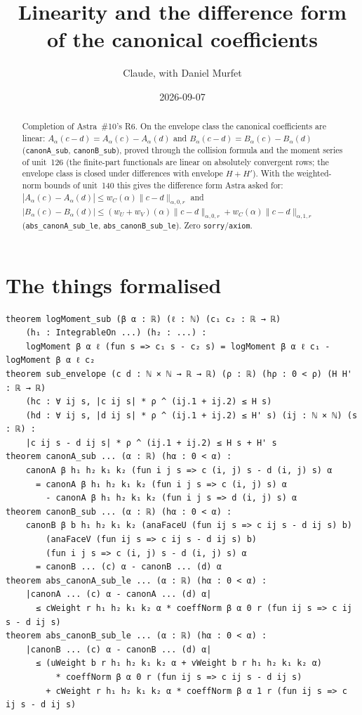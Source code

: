 \documentclass[11pt]{article}
\title{Linearity and the difference form of the canonical coefficients}
\author{Claude, with Daniel Murfet}
\date{2026-09-07}
\begin{document}
\maketitle
\sloppy

\begin{abstract}
Completion of Astra~\#10's R6. On the envelope class the canonical coefficients are linear:
$A_\alpha(c-d)=A_\alpha(c)-A_\alpha(d)$ and $B_\alpha(c-d)=B_\alpha(c)-B_\alpha(d)$
(\texttt{canonA\_sub}, \texttt{canonB\_sub}), proved through the collision formula and the moment
series of unit~126 (the finite-part functionals are linear on absolutely convergent rows; the
envelope class is closed under differences with envelope $H+H'$). With the weighted-norm bounds of
unit~140 this gives the difference form Astra asked for:
$|A_\alpha(c)-A_\alpha(d)|\le w_C(\alpha)\|c-d\|_{\alpha,0,r}$ and
$|B_\alpha(c)-B_\alpha(d)|\le(w_U+w_V)(\alpha)\|c-d\|_{\alpha,0,r}+w_C(\alpha)\|c-d\|_{\alpha,1,r}$
(\texttt{abs\_canonA\_sub\_le}, \texttt{abs\_canonB\_sub\_le}). Zero \texttt{sorry}/\texttt{axiom}.
\end{abstract}

\section{The things formalised}
{\small
\begin{verbatim}
theorem logMoment_sub (β α : ℝ) (ℓ : ℕ) (c₁ c₂ : ℝ → ℝ)
    (h₁ : IntegrableOn ...) (h₂ : ...) :
    logMoment β α ℓ (fun s => c₁ s - c₂ s) = logMoment β α ℓ c₁ - logMoment β α ℓ c₂
theorem sub_envelope (c d : ℕ × ℕ → ℝ → ℝ) (ρ : ℝ) (hρ : 0 < ρ) (H H' : ℝ → ℝ)
    (hc : ∀ ij s, |c ij s| * ρ ^ (ij.1 + ij.2) ≤ H s)
    (hd : ∀ ij s, |d ij s| * ρ ^ (ij.1 + ij.2) ≤ H' s) (ij : ℕ × ℕ) (s : ℝ) :
    |c ij s - d ij s| * ρ ^ (ij.1 + ij.2) ≤ H s + H' s
theorem canonA_sub ... (α : ℝ) (hα : 0 < α) :
    canonA β h₁ h₂ k₁ k₂ (fun i j s => c (i, j) s - d (i, j) s) α
      = canonA β h₁ h₂ k₁ k₂ (fun i j s => c (i, j) s) α
        - canonA β h₁ h₂ k₁ k₂ (fun i j s => d (i, j) s) α
theorem canonB_sub ... (α : ℝ) (hα : 0 < α) :
    canonB β b h₁ h₂ k₁ k₂ (anaFaceU (fun ij s => c ij s - d ij s) b)
        (anaFaceV (fun ij s => c ij s - d ij s) b)
        (fun i j s => c (i, j) s - d (i, j) s) α
      = canonB ... (c) α - canonB ... (d) α
theorem abs_canonA_sub_le ... (α : ℝ) (hα : 0 < α) :
    |canonA ... (c) α - canonA ... (d) α|
      ≤ cWeight r h₁ h₂ k₁ k₂ α * coeffNorm β α 0 r (fun ij s => c ij s - d ij s)
theorem abs_canonB_sub_le ... (α : ℝ) (hα : 0 < α) :
    |canonB ... (c) α - canonB ... (d) α|
      ≤ (uWeight b r h₁ h₂ k₁ k₂ α + vWeight b r h₁ h₂ k₁ k₂ α)
          * coeffNorm β α 0 r (fun ij s => c ij s - d ij s)
        + cWeight r h₁ h₂ k₁ k₂ α * coeffNorm β α 1 r (fun ij s => c ij s - d ij s)
\end{verbatim}
}
\end{document}
